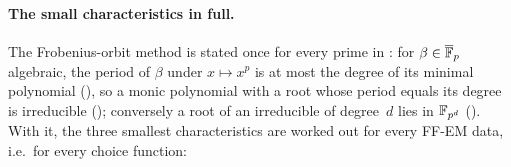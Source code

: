 \paragraph{The small characteristics in full.}
The Frobenius-orbit method is stated once for every prime in
: for $\beta \in \overline{\mathbb{F}}_p$
algebraic, the period of $\beta$ under $x \mapsto x^p$ is at most the degree
of its minimal polynomial
(),
so a monic polynomial with a root whose period equals its degree is
irreducible
();
conversely a root of an irreducible of degree~$d$ lies in $\mathbb{F}_{p^d}$
().
With it, the three smallest characteristics are worked out for every
FF-EM data, i.e.\ for every choice function:
